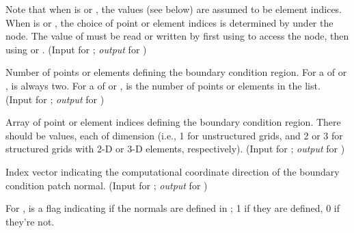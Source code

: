 \begin{Ventryi}{}
      Note that when  is  or
      , the  values (see below) are assumed
      to be element indices.
      When  is  or ,
      the choice of point or element indices is determined by
       under the  node.
      The value of  must be read or
      written by first using  to access the
       node, then using  or
      .
      (\textcolor{input}{Input} for ;
      \textcolor{output}{\textit{output}} for )
\item [\fort{npnts}]
      Number of points or elements defining the boundary
      condition region.
      For a  of  or ,
       is always two.
      For a  of  or ,
       is the number of points or elements in the list.
      (\textcolor{input}{Input} for ;
      \textcolor{output}{\textit{output}} for )
\item [\fort{pnts}]
      Array of point or element indices defining the boundary condition
      region.
      There should be  values, each of dimension
       (i.e., 1 for unstructured grids,
      and 2 or 3 for structured grids with 2-D or 3-D elements,
      respectively).
      (\textcolor{input}{Input} for ;
      \textcolor{output}{\textit{output}} for )
\item [\fort{NormalIndex}]
      Index vector indicating the computational coordinate direction
      of the boundary condition patch normal.
      (\textcolor{input}{Input} for ;
      \textcolor{output}{\textit{output}} for )
\item [\fort{NormalListFlag}]
      For ,  is a
      flag indicating if the normals are defined in ;
      1 if they are defined, 0 if they're not.


\end{Ventryi}
